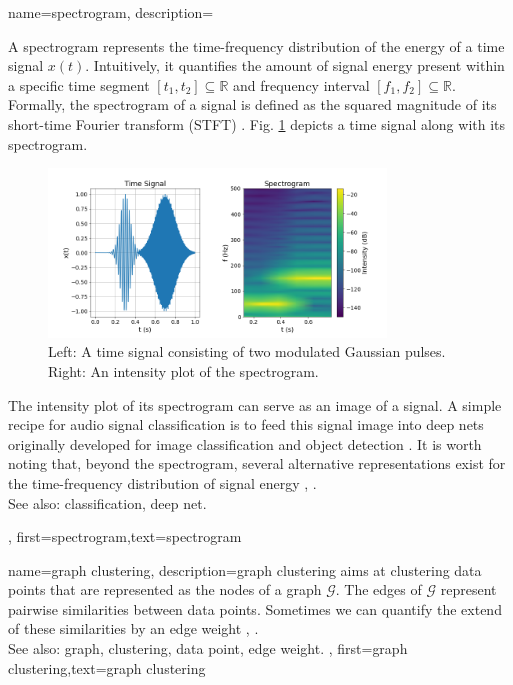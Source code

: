 {name={spectrogram},
	description={
		A spectrogram represents the time-frequency distribution of the energy of a time signal $x(t)$.  
		Intuitively, it quantifies the amount of signal energy present within a specific time segment 
		$[t_{1},t_{2}] \subseteq \mathbb{R}$ and frequency interval $[f_{1},f_{2}]\subseteq \mathbb{R}$. 
		Formally, the spectrogram of a signal is defined as the squared magnitude of its 
		short-time Fourier transform (STFT) \cite{cohen1995time}.
        Fig. \ref{fig:spectrogram_dict} depicts a time signal along with its spectrogram. 
	\begin{figure}[H]
		\centering
		\includegraphics[width=0.8\textwidth]{assets/spectrogram.png}
		\caption{Left: A time signal consisting of two modulated Gaussian pulses. Right: An intensity 
		plot of the spectrogram.
		\label{fig:spectrogram_dict}}
	\end{figure}
        The intensity plot of its spectrogram can serve as an image of a signal. A 
		simple recipe for audio signal classification is to feed this signal image 
		into deep nets originally developed for image classification and object detection \cite{Li:2022aa}. 
		It is worth noting that, beyond the spectrogram, several alternative representations exist 
		for the time-frequency distribution of signal energy \cite{TimeFrequencyAnalysisBoashash}, \cite{MallatBook}.
					\\ 
		See also: classification, deep net.
		}, 
	first={spectrogram},text={spectrogram} 
}

{name={graph clustering},
	description={\Gls{graph} clustering aims at 
		clustering data points that are represented as the nodes 
		of a graph $\mathcal{G}$. The edges of $\mathcal{G}$ represent 
		pairwise similarities between data points. Sometimes we
		can quantify the extend of these similarities by an edge weight \cite{FlowSpecClustering2021}, \cite{Luxburg2007}.
					\\ 
		See also: graph, clustering, data point, edge weight. }, 
	first={graph clustering},text={graph clustering} 
}

